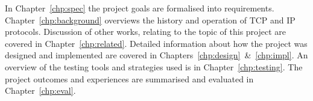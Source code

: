     In Chapter~\ref{chp:spec} the project goals are formalised into requirements. Chapter~\ref{chp:background} overviews the history and operation of TCP and IP protocols. Discussion of other works, relating to the topic of this project are covered in Chapter~\ref{chp:related}. Detailed information about how the project was designed and implemented are covered in Chapters~\ref{chp:design}~\&~\ref{chp:impl}. An overview of the testing tools and strategies used is in Chapter~\ref{chp:testing}. The project outcomes and experiences are summarised and evaluated in Chapter~\ref{chp:eval}.

